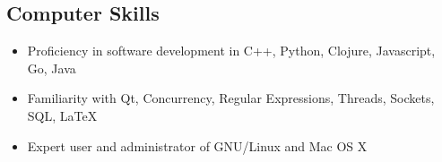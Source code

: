 \documentclass[overlapped,line,letterpaper]{res}
\begin{document}
\begin{resume}



\section{\bf Computer Skills}
\begin{itemize}
\item Proficiency in software development in C++, Python, Clojure, Javascript, Go, Java
\item Familiarity with Qt, Concurrency, Regular Expressions, Threads, Sockets, SQL, \LaTeX
\item Expert user and administrator of GNU/Linux and Mac OS X
\end{itemize}


%





\end{resume}
\end{document}

